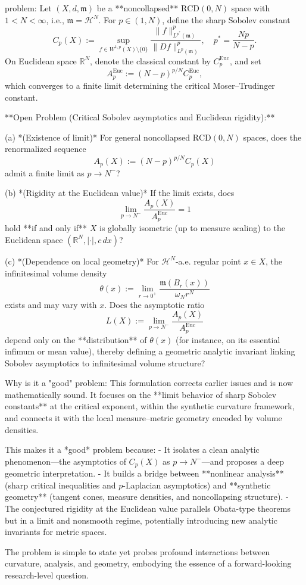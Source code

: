 problem:  
Let \((X,d,\mathfrak{m})\) be a **noncollapsed** \(\mathrm{RCD}(0,N)\) space with \(1<N<\infty\), i.e., \(\mathfrak{m}=\mathcal{H}^N\).  
For \(p\in(1,N)\), define the sharp Sobolev constant
\[
C_p(X):=\sup_{f\in W^{1,p}(X)\setminus\{0\}}
\frac{\|f\|_{L^{p^*}(\mathfrak{m})}^{p}}{\|Df\|_{L^{p}(\mathfrak{m})}^{p}}, 
\quad p^*=\frac{Np}{N-p}.
\]
On Euclidean space \(\mathbb{R}^N\), denote the classical constant by \(C_p^{\mathrm{Euc}}\), and set
\[
A_p^{\mathrm{Euc}}:=(N-p)^{p/N}C_p^{\mathrm{Euc}},
\]
which converges to a finite limit determining the critical Moser–Trudinger constant.  

**Open Problem (Critical Sobolev asymptotics and Euclidean rigidity):**  

(a) *(Existence of limit)* For general noncollapsed \(\mathrm{RCD}(0,N)\) spaces, does the renormalized sequence  
\[
A_p(X):=(N-p)^{p/N}C_p(X)
\]
admit a finite limit as \(p\to N^{-}\)?  

(b) *(Rigidity at the Euclidean value)* If the limit exists, does
\[
\lim_{p\to N^-}\frac{A_p(X)}{A_p^{\mathrm{Euc}}}=1
\]
hold **if and only if** \(X\) is globally isometric (up to measure scaling) to the Euclidean space \((\mathbb{R}^N,|\cdot|,c\,dx)\)?  

(c) *(Dependence on local geometry)*  
For \(\mathcal{H}^N\)-a.e. regular point \(x\in X\), the infinitesimal volume density
\[
\theta(x):=\lim_{r\to0^+}\frac{\mathfrak{m}(B_r(x))}{\omega_N r^N}
\]
exists and may vary with \(x\).  
Does the asymptotic ratio
\[
L(X):=\lim_{p\to N^-}\frac{A_p(X)}{A_p^{\mathrm{Euc}}}
\]
depend only on the **distribution** of \(\theta(x)\) (for instance, on its essential infimum or mean value), thereby defining a geometric analytic invariant linking Sobolev asymptotics to infinitesimal volume structure?

Why is it a "good" problem:  
This formulation corrects earlier issues and is now mathematically sound. It focuses on the **limit behavior of sharp Sobolev constants** at the critical exponent, within the synthetic curvature framework, and connects it with the local measure–metric geometry encoded by volume densities.  

This makes it a *good* problem because:  
- It isolates a clean analytic phenomenon—the asymptotics of \(C_p(X)\) as \(p\to N^-\)—and proposes a deep geometric interpretation.  
- It builds a bridge between **nonlinear analysis** (sharp critical inequalities and \(p\)-Laplacian asymptotics) and **synthetic geometry** (tangent cones, measure densities, and noncollapsing structure).  
- The conjectured rigidity at the Euclidean value parallels Obata-type theorems but in a limit and nonsmooth regime, potentially introducing new analytic invariants for metric spaces.  

The problem is simple to state yet probes profound interactions between curvature, analysis, and geometry, embodying the essence of a forward-looking research-level question.